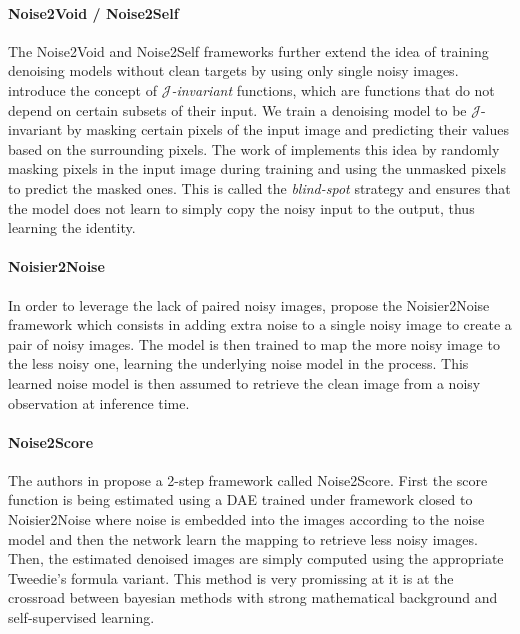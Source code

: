 \paragraph{Noise2Void / Noise2Self}

The Noise2Void \cite{krull_noise2void_2019} and Noise2Self \cite{batson_noise2self_nodate} frameworks further extend the idea of training denoising models without clean targets by using only single noisy images.
\cite{batson_noise2self_nodate} introduce the concept of \textit{$\mathcal{J}$-invariant} functions, which are functions that do not depend on certain subsets of their input.
We train a denoising model to be $\mathcal{J}$-invariant by masking certain pixels of the input image and predicting their values based on the surrounding pixels.
The work of \cite{krull_noise2void_2019} implements this idea by randomly masking pixels in the input image during training and using the unmasked pixels to predict the masked ones.
This is called the \textit{blind-spot} strategy and ensures that the model does not learn to simply copy the noisy input to the output, thus learning the identity.

\paragraph{Noisier2Noise}

In order to leverage the lack of paired noisy images, \cite{moran_noisier2noise_2019} propose the Noisier2Noise framework which consists in adding extra noise to a single noisy image to create a pair of noisy images.
The model is then trained to map the more noisy image to the less noisy one, learning the underlying noise model in the process.
This learned noise model is then assumed to retrieve the clean image from a noisy observation at inference time.

\paragraph{Noise2Score}

The authors in \cite{kim_noise2score_nodate} propose a 2-step framework called Noise2Score. First the score function is being estimated using a DAE trained under framework closed to Noisier2Noise \cite{moran_noisier2noise_2019} where noise is embedded into the images according to the noise model and then the network learn the mapping to retrieve less noisy images.
Then, the estimated denoised images are simply computed using the appropriate Tweedie's formula variant.
This method is very promissing at it is at the crossroad between bayesian methods with strong mathematical background and self-supervised learning.

